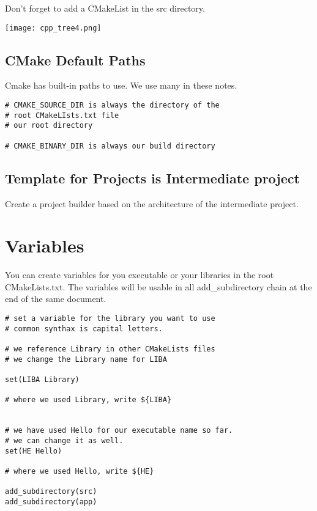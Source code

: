 Don't forget to add a CMakeList in the src directory.


\begin{center}
    \texttt{[image: cpp\_tree4.png]}
\end{center}

\subsection{CMake Default Paths}

Cmake has built-in paths to use. We use many in these notes.

\begin{verbatim}
# CMAKE_SOURCE_DIR is always the directory of the
# root CMakeLIsts.txt file
# our root directory

# CMAKE_BINARY_DIR is always our build directory
\end{verbatim}



\subsection{Template for Projects is Intermediate project}

Create a project builder based on the architecture of the intermediate project.


\section{Variables}

You can create variables for you executable or your libraries in the root CMakeLists.txt. The variables
will be usable in all add\_subdirectory chain at the end of the same document.

\begin{verbatim}
# set a variable for the library you want to use
# common synthax is capital letters.

# we reference Library in other CMakeLists files
# we change the Library name for LIBA

set(LIBA Library)

# where we used Library, write ${LIBA}


# we have used Hello for our executable name so far.
# we can change it as well.
set(HE Hello)

# where we used Hello, write ${HE}

add_subdirectory(src)
add_subdirectory(app)
\end{verbatim}



